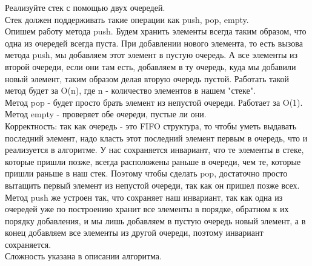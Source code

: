 \documentclass[12pt]{extreport}
\theoremstyle{definiton}
\theoremstyle{definition}
\theoremstyle{definition}
\newcounter{problem}
\newcounter{uproblem}
\newcounter{subproblem}
\def\beforPRskip{
	\bigskip
}
\def\upr{\beforPRskip\noindent\stepcounter{uproblem}{\bf Упражнение \theuproblem.}\setcounter{subproblem}{0}\;}
\begin{document}
	

			
			\Pr[2] Реализуйте стек с помощью двух очередей.
            \newline
            \\ Стек должен поддерживать такие операции как push, pop, empty.
            \\ Опишем работу метода push. Будем хранить элементы всегда таким образом, что одна из очередей всегда пуста. При добавлении нового элемента, то есть вызова метода push, мы добавляем этот элемент в пустую очередь. А все элементы из второй очереди, если они там есть, добавляем в ту очередь, куда мы добавили новый элемент, таким образом делая вторую очередь пустой. Работать такой метод будет за O(n), где n - количество элементов в нашем "стеке".
            \\ Метод pop - будет просто брать элемент из непустой очереди. Работает за O(1).
            \\ Метод empty - проверяет обе очереди, пустые ли они.
            \\Корректность: так как очередь - это FIFO структура, то чтобы уметь выдавать последний элемент, надо класть этот последний элемент первым в очередь, что и реализуется в алгоритме. У нас сохраняется инвариант, что те элементы в стеке, которые пришли позже, всегда расположены раньше в очереди, чем те, которые пришли раньше в наш стек. Поэтому чтобы сделать pop, достаточно просто вытащить первый элемент из непустой очереди, так как он пришел позже всех. Метод push же устроен так, что сохраняет наш инвариант, так как одна из очередей уже по построению хранит все элементы в порядке, обратном к их порядку добавления, и мы лишь добавляем в пустую очередь новый элемент, а в конец добавляем все элементы из другой очереди, поэтому инвариант сохраняется.
            \\ Сложность указана в описании алгоритма.
\end{document}
